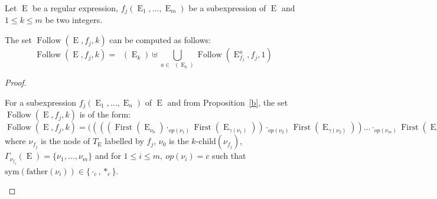 \documentclass{llncs}
\DeclareMathOperator{\First}{First}
\DeclareMathOperator{\Follow}{Follow}
\DeclareMathOperator{\E}{E}
\DeclareMathOperator{\Fir}{Fr_>}
\DeclareMathOperator{\Firs}{Fr_0}
\def\firstt#1{\Fir{(#1)}}
\def\firs#1{\Firs{(#1)}}
\begin{document}
\begin{proposition}\label{propFw}
Let $\E$ be a regular expression, $f_j(\E_1,\ldots,\E_m)$ be a subexpression of $\E$ and $1\leq k\leq m$ be two integers. 
 
 The set $\Follow(\E,f_j,k)$ can be computed as follows: 
 $$\Follow(\E,f_j,k)=\firstt{\E_k}\uplus \displaystyle\bigcup_{a\in \firs{\E_k}}\Follow(\E^a_{f_j},f_j,1)$$
\end{proposition}
\begin{proof}
\begin{sloppy}  
  
 For a subexpression $f_j(\E_1,\ldots,\E_n)$ of $\E$ and from Proposition~\ref{b}, the set $\Follow(\E,f_j,k)$ is of the form: 
$\Follow(\E,f_j,k)= ((((\First(\E_{\nu_0})\cdot_{op(\nu_1)} \First(\E_{\gamma(\nu_1)}))\cdot_{op(\nu_2)} \First(\E_{\gamma(\nu_2)}))
\dots \cdot_{op(\nu_{m})} \First(\E_{\gamma(\nu_m)}))$ where $\nu_{f_j}$ is the node of $T_{\E}$ labelled by $f_j$, $\nu_0$ is the $k\mbox{-}\mathrm{child}(\nu_{f_j})$, $\Gamma_{\nu_{f_j}}(\E)=\{\nu_1, \dots,\nu_m \}$ and for $1\leq i\leq m,~op(\nu_i)=c$ such that $\mathrm{sym}(\mathrm{father}(\nu_i)) \in \{\cdot_c,{*_c}\}$. 
 

\end{sloppy}
\end{proof}
\end{document}
